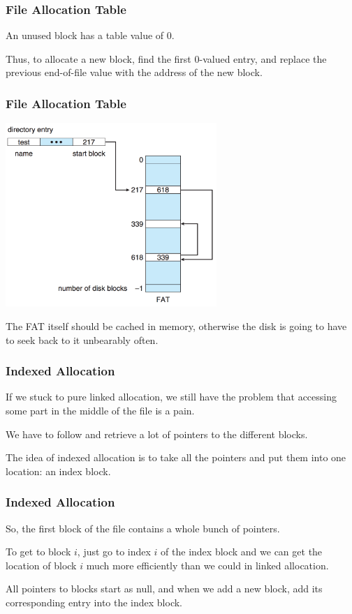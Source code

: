 \begin{frame}
\frametitle{File Allocation Table}

An unused block has a table value of 0. 

Thus, to allocate a new block, find the first 0-valued entry, and replace the previous end-of-file value with the address of the new block.

\end{frame}

\begin{frame}
\frametitle{File Allocation Table}

\begin{center}
	\includegraphics[width=0.6\textwidth]{images/file-allocation-table.png}
\end{center}

The FAT itself should be cached in memory, otherwise the disk is going to have to seek back to it unbearably often.

\end{frame}



\begin{frame}
\frametitle{Indexed Allocation}

If we stuck to pure linked allocation, we still have the problem that accessing some part in the middle of the file is a pain.

We have to follow and retrieve a lot of pointers to the different blocks. 

The idea of indexed allocation is to take all the pointers and put them into one location: an index block. 


\end{frame}



\begin{frame}
\frametitle{Indexed Allocation}

So, the first block of the file contains a whole bunch of pointers. 

To get to block $i$, just go to index $i$ of the index block and we can get the location of block $i$ much more efficiently than we could in linked allocation. 

All pointers to blocks start as null, and when we add a new block, add its corresponding entry into the index block.

\end{frame}

